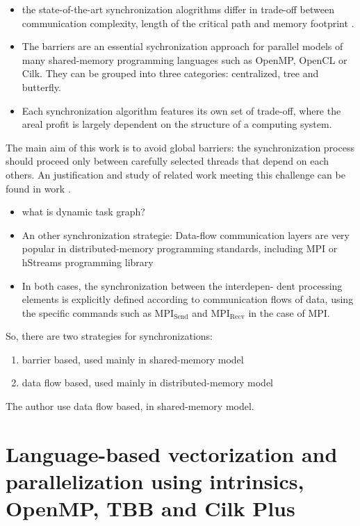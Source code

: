 \documentclass[11pt]{article}
\begin{document}
\begin{itemize}
\item the state-of-the-art synchronization alogrithms differ in trade-off between communication complexity, length of the critical path and memory footprint \cite{braeken17_effic_anony_authen_protoc_multip}.
\item The barriers are an essential sychronization approach for parallel models of many shared-memory programming languages such as OpenMP, OpenCL or Cilk. They can be grouped into three categories: centralized, tree and butterfly.
\item Each synchronization algorithm features its own set of trade-off, where the areal profit is largely dependent on the structure of a computing system.
\end{itemize}

The main aim of this work is to avoid global barriers: the synchronization process should proceed only between carefully selected threads that depend on each others. An justification and study of related work meeting this challenge can be found in work \cite{bhatti13_effic_synch_stenc_comput_using}.
\begin{itemize}
\item what is dynamic task graph?

\item An other synchronization strategie: Data-flow communication layers are very popular in distributed-memory programming standards, including MPI or hStreams programming library
\item In both cases, the synchronization between the interdepen- dent processing elements is explicitly defined according to communication flows of data, using the specific commands such as MPI$_{\text{Send}}$ and MPI$_{\text{Recv}}$ in the case of MPI.
\end{itemize}

So, there are two strategies for synchronizations:
\begin{enumerate}
\item barrier based, used mainly in shared-memory model
\item data flow based, used mainly in distributed-memory model
\end{enumerate}

The author use data flow based, in shared-memory model.

\section{Language-based vectorization and parallelization using intrinsics, OpenMP, TBB and Cilk Plus  \cite{stpiczynski18_languag_based_vector_paral_using}}
\label{sec-5}
\end{document}
